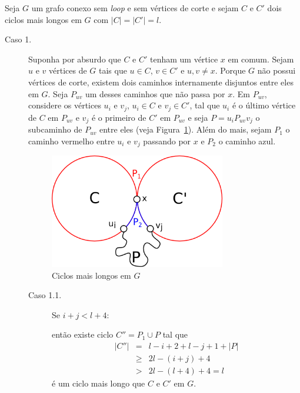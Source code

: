 
Seja $G$ um grafo conexo sem \emph{loop} e sem vértices de corte e sejam $C$
e $C'$ dois ciclos mais longos em $G$ com $|C| = |C'| = l$.

\begin{description}

\item[Caso 1.] Suponha por absurdo que $C$ e $C'$ tenham um vértice $x$ em
comum. Sejam $u$ e $v$ vértices de $G$ tais que $u \in C$, $v \in C'$ e $u,v
\ne x$. Porque $G$ não possui vértices de corte, existem dois caminhos
internamente disjuntos entre eles em $G$. Seja $P_{uv}$ um desses caminhos que
não passa por $x$. Em $P_{uv}$, considere os vértices $u_i$ e $v_j$, $u_i \in
C$ e $v_j \in C'$, tal que $u_i$ é o último vértice de $C$ em $P_{uv}$ e $v_j$
é o primeiro de $C'$ em $P_{uv}$ e seja $P = u_iP_{uv}v_j$ o subcaminho de
$P_{uv}$ entre eles (veja Figura~\ref{fig:ciclos}). Além do mais, sejam $P_1$ o
caminho vermelho entre $u_i$ e $v_j$ passando por $x$ e $P_2$ o caminho azul.

\begin{figure}[htb]
    \centering
    \includegraphics[height=5cm, width=7.67cm]{figuras/graph_q515}
    \caption{Ciclos mais longos em $G$}
    \label{fig:ciclos}
\end{figure}

    \begin{description}
        \item[Caso 1.1.] Se $i + j < l + 4$:

        então existe ciclo $C'' = P_1 \cup P$ tal que
        \begin{eqnarray}
            |C''| &=& l - i + 2 + l - j + 1 + |P| \nonumber \\
                &\ge& 2l - (i + j) + 4 \nonumber \\
                &>& 2l - (l + 4) + 4 = l \nonumber
        \end{eqnarray}
        é um ciclo mais longo que $C$ e $C'$ em $G$.


\end{description}
\end{description}
